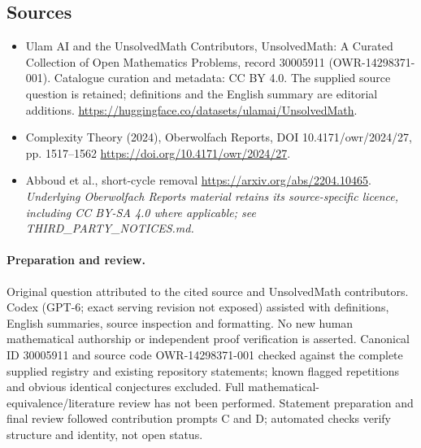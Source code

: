 \documentclass[11pt]{article}
\begin{document}
\subsection{Sources}
\begin{itemize}
\item[\hypertarget{source:30005911:1}{S1}] Ulam AI and the UnsolvedMath Contributors, UnsolvedMath: A Curated Collection of Open Mathematics Problems, record 30005911 (OWR-14298371-001). Catalogue curation and metadata: CC BY 4.0. The supplied source question is retained; definitions and the English summary are editorial additions.
\url{https://huggingface.co/datasets/ulamai/UnsolvedMath}.
\item[\hypertarget{source:30005911:2}{S2}] Complexity Theory (2024), Oberwolfach Reports, DOI 10.4171/owr/2024/27, pp. 1517--1562
\url{https://doi.org/10.4171/owr/2024/27}.
\item[\hypertarget{source:30005911:3}{S3}] Abboud et al., short-cycle removal
\url{https://arxiv.org/abs/2204.10465}.
\textit{Underlying Oberwolfach Reports material retains its source-specific licence, including CC BY-SA 4.0 where applicable; see THIRD\_PARTY\_NOTICES.md.}
\end{itemize}
\paragraph{Preparation and review.}
Original question attributed to the cited source and UnsolvedMath contributors. Codex (GPT-6; exact serving revision not exposed) assisted with definitions, English summaries, source inspection and formatting. No new human mathematical authorship or independent proof verification is asserted. Canonical ID 30005911 and source code OWR-14298371-001 checked against the complete supplied registry and existing repository statements; known flagged repetitions and obvious identical conjectures excluded. Full mathematical-equivalence/literature review has not been performed. Statement preparation and final review followed contribution prompts C and D; automated checks verify structure and identity, not open status.
\label{end:30005911}
\end{document}
